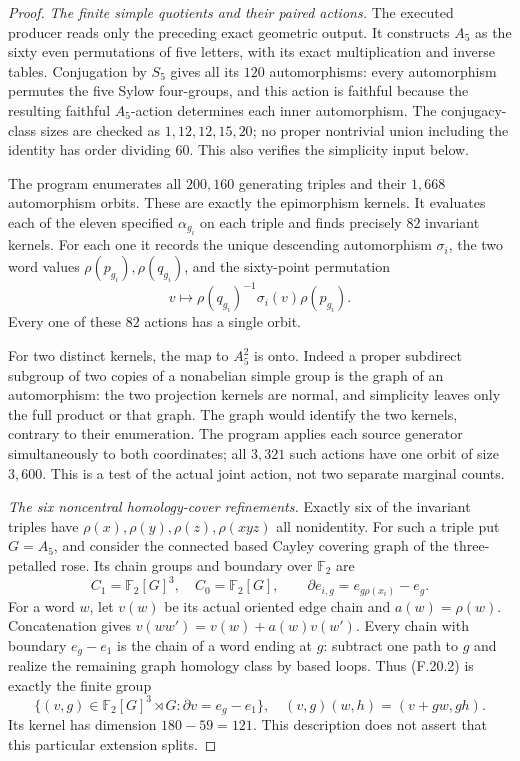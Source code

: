 \begin{proof}
\emph{The finite simple quotients and their paired actions.}
The executed producer
reads only the preceding exact geometric output.
It constructs $A_5$ as the sixty even permutations
of five letters, with its exact multiplication
and inverse tables. Conjugation by $S_5$ gives
all its $120$ automorphisms: every automorphism
permutes the five Sylow four-groups, and this
action is faithful because the resulting faithful
$A_5$-action determines each inner automorphism.
The conjugacy-class sizes are checked as
$1,12,12,15,20$; no proper nontrivial union
including the identity has order dividing $60$.
This also verifies the simplicity input below.

The program enumerates all $200,160$ generating
triples and their $1,668$ automorphism orbits.
These are exactly the epimorphism kernels.
It evaluates each of the eleven specified
$\alpha_{g_i}$ on each triple and finds precisely
$82$ invariant kernels. For each one it records
the unique descending automorphism $\sigma_i$,
the two word values $\rho(p_{g_i}),\rho(q_{g_i})$,
and the sixty-point permutation
\[
       v\longmapsto
       \rho(q_{g_i})^{-1}\sigma_i(v)\rho(p_{g_i}).
                                                               \tag{F.20.17}
\]
Every one of these $82$ actions has a single orbit.

For two distinct kernels, the map to $A_5^2$
is onto. Indeed a proper subdirect subgroup of
two copies of a nonabelian simple group is the
graph of an automorphism: the two projection
kernels are normal, and simplicity leaves
only the full product or that graph.
The graph would identify the two kernels,
contrary to their enumeration.
The program applies each source generator
simultaneously to both coordinates; all
$3,321$ such actions have one orbit of size
$3,600$. This is a test of the actual joint
action, not two separate marginal counts.

\emph{The six noncentral homology-cover refinements.}
Exactly six of the invariant triples have
$\rho(x),\rho(y),\rho(z),\rho(xyz)$ all nonidentity.
For such a triple put $G=A_5$, and consider the
connected based Cayley covering graph of the
three-petalled rose. Its chain groups and
boundary over $\mathbb F_2$ are
\[
 C_1=\mathbb F_2[G]^3,\quad C_0=\mathbb F_2[G],
 \qquad \partial e_{i,g}=e_{g\rho(x_i)}-e_g .
                                                               \tag{F.20.18}
\]
For a word $w$, let $v(w)$ be its actual oriented
edge chain and $a(w)=\rho(w)$.
Concatenation gives
$v(ww')=v(w)+a(w)v(w')$.
Every chain with boundary $e_g-e_1$ is the chain
of a word ending at $g$: subtract one path to
$g$ and realize the remaining graph homology
class by based loops.
Thus (F.20.2) is exactly the finite group
\[
 \{(v,g)\in\mathbb F_2[G]^3\rtimes G:
                       \partial v=e_g-e_1\},
 \quad
 (v,g)(w,h)=(v+gw,gh).
                                                               \tag{F.20.19}
\]
Its kernel has dimension $180-59=121$.
This description does not assert that this
particular extension splits.


\end{proof}
